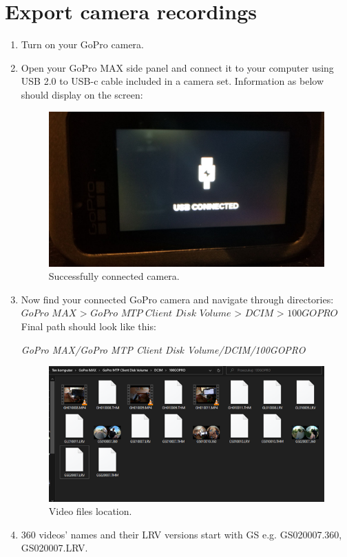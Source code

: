 \documentclass[a4paper,12pt]{book}
\begin{document}
\section{Export camera recordings}
\begin{enumerate}
	\item Turn on your GoPro camera.
	\item Open your GoPro MAX side panel and connect it to your computer using USB 2.0 to USB-c cable included in a camera set. Information as below should display on the screen:
	\begin{figure}[H]
		\centering
		\includegraphics{camera_connected}
		\caption{Successfully connected camera.}
	\end{figure} 
	
	\item Now find your connected GoPro camera and navigate through directories:\\
	
	$\textit{GoPro MAX > GoPro MTP Client Disk Volume > DCIM > 100GOPRO}$	\\
	
	Final path should look like this:
	
	\textit{GoPro MAX/GoPro MTP Client Disk Volume/DCIM/100GOPRO}	
	\begin{figure}[H]
		\centering
		\includegraphics{recording_location}
		\caption{Video files location.}
	\end{figure}
	\hfill
	\item 360 videos’ names and their LRV versions start with GS e.g. GS020007.360, GS020007.LRV.\\
	

\end{enumerate}
\end{document}
